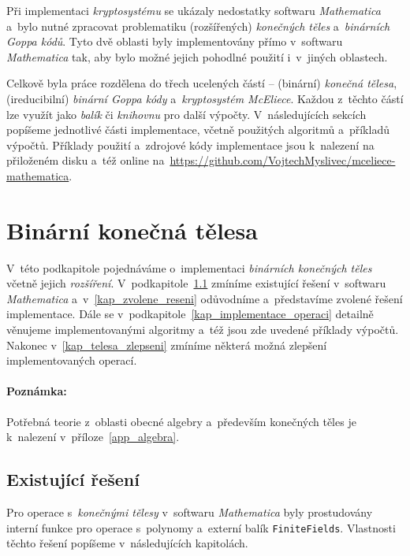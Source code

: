 \documentclass[thesis=M,czech,hidelinks]{FITthesis}[2012/06/26]
\newcommand{\0}{{\textcolor[gray]{0.75}{0}}}
\begin{document}
Při implementaci \emph{kryptosystému} se ukázaly nedostatky softwaru
\emph{Mathematica} a~bylo nutné zpracovat problematiku (rozšířených)
\emph{konečných těles} a~\emph{binárních Goppa kódů}. Tyto dvě oblasti byly
implementovány přímo v~softwaru \emph{Mathematica} tak, aby bylo možné jejich
pohodlné použití i~v~jiných oblastech.

Celkově byla práce rozdělena do třech ucelených částí -- (binární) \emph{konečná
tělesa}, (ireducibilní) \emph{binární Goppa kódy} a~\emph{kryptosystém
McEliece}. Každou z~těchto částí lze využít jako \emph{balík} či \emph{knihovnu}
pro další výpočty. V~následujících sekcích popíšeme jednotlivé části
implementace, včetně použitých algoritmů a~příkladů výpočtů. Příklady použití
a~zdrojové kódy implementace jsou k~nalezení na přiloženém disku a~též online
na~\url{https://github.com/VojtechMyslivec/mceliece-mathematica}.



\section{Binární konečná tělesa}\label{kap_implementace_teles}

V~této podkapitole pojednáváme o~implementaci \emph{binárních konečných těles}
včetně jejich \emph{rozšíření}. V~podkapitole~\ref{kap_existujici_reseni}
zmíníme existující řešení v~softwaru \emph{Mathematica}
a~v~\ref{kap_zvolene_reseni} odůvodníme a~představíme zvolené řešení
implementace. Dále se v~podkapitole~\ref{kap_implementace_operaci} detailně
věnujeme implementovanými algoritmy a~též jsou zde uvedené příklady výpočtů.
Nakonec v~\ref{kap_telesa_zlepseni} zmíníme některá možná zlepšení
implementovaných operací.

\paragraph{Poznámka:} Potřebná teorie z~oblasti obecné algebry a~především
konečných těles je k~nalezení v~příloze~\ref{app_algebra}.

\subsection{Existující řešení}\label{kap_existujici_reseni}

Pro operace s~\emph{konečnými tělesy} v~softwaru \emph{Mathematica} byly
prostudovány interní funkce pro operace s~polynomy a~externí balík
\texttt{FiniteFields}. Vlastnosti těchto řešení popíšeme v~následujících
kapitolách.
\end{document}
